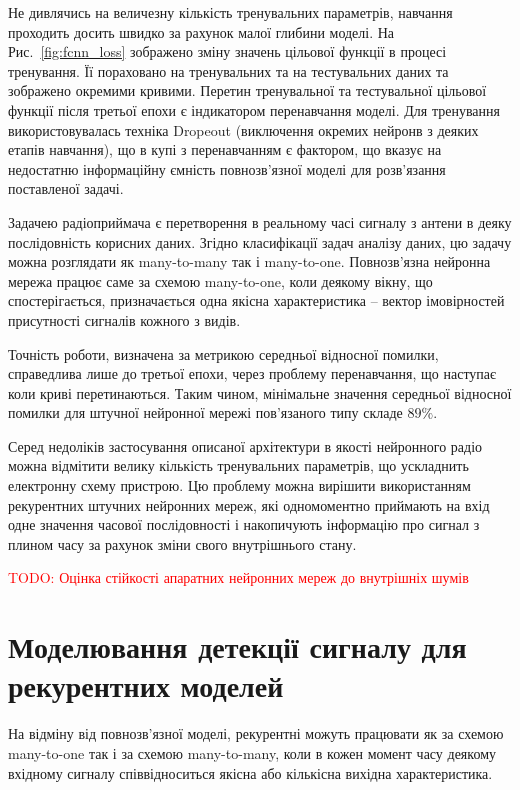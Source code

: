 Не дивлячись на величезну кількість тренувальних параметрів, навчання 
проходить досить швидко за рахунок малої глибини моделі. 
На Рис.~\ref{fig:fcnn_loss} зображено зміну значень цільової функції в 
процесі тренування. Її пораховано на тренувальних та на тестувальних даних 
та зображено окремими кривими. Перетин тренувальної та тестувальної 
цільової функції після третьої епохи є індикатором перенавчання моделі. 
Для тренування використовувалась техніка Dropeout (виключення окремих 
нейронв з деяких етапів навчання), що в купі з перенавчанням є фактором, 
що вказує на недостатню інформаційну ємність повнозв'язної моделі для 
розв'язання поставленої задачі.

Задачею радіоприймача є перетворення в реальному часі сигналу з антени в 
деяку послідовність корисних даних. Згідно класифікації задач аналізу даних, 
цю задачу можна розглядати як many-to-many так і many-to-one. Повнозв'язна 
нейронна мережа працює саме за схемою many-to-one, коли деякому вікну, що 
спостерігається, призначається одна якісна характеристика -- вектор 
імовірностей присутності сигналів кожного з видів.

Точність роботи, визначена за метрикою середньої відносної помилки,
справедлива лише до третьої епохи, через проблему перенавчання, що наступає 
коли криві перетинаються. Таким чином, мінімальне значення середньої 
відносної помилки для штучної нейронної мережі пов'язаного типу складе 
$ 89 \% $.

Серед недоліків застосування описаної архітектури в якості нейронного радіо
можна відмітити велику кількість тренувальних параметрів, що ускладнить 
електронну схему пристрою. Цю проблему можна вирішити використанням 
рекурентних штучних нейронних мереж, які одномоментно приймають на вхід 
одне значення часової послідовності і накопичують інформацію про сигнал 
з плином часу за рахунок зміни свого внутрішнього стану.

\textcolor{red}{TODO: Оцінка стійкості апаратних нейронних мереж до 
внутрішніх шумів}

\section{Моделювання детекції сигналу для рекурентних моделей}

На відміну від повнозв'язної моделі, рекурентні можуть працювати як за схемою
many-to-one так і за схемою many-to-many, коли в кожен момент часу деякому 
вхідному сигналу співвідноситься якісна або кількісна вихідна характеристика.

